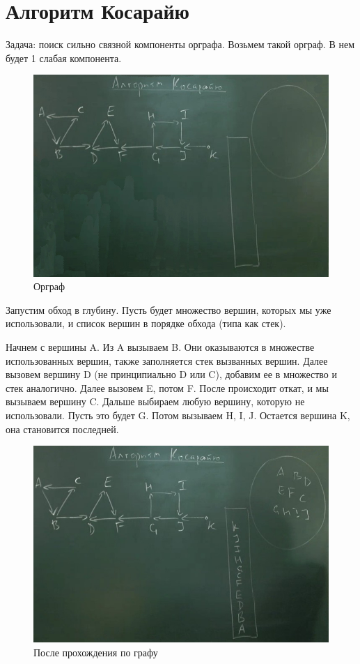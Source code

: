 \section{Алгоритм Косарайю}
Задача: поиск сильно связной компоненты орграфа. Возьмем такой орграф. В нем будет 1 слабая компонента.
\vspace{1.2cm}
\begin{figure}[h!]
	\centering
	\includegraphics[width=0.8\linewidth]{lection_18/kos1}
	\caption{Орграф}
\end{figure}

Запустим обход в глубину. Пусть будет множество вершин, которых мы уже использовали, и список вершин в порядке обхода (типа как стек).

Начнем с вершины A. Из A вызываем B. Они оказываются в множестве использованных вершин, также заполняется стек вызванных вершин. Далее вызовем вершину D (не принципиально D или C), добавим ее в множество и стек аналогично. Далее вызовем E, потом F. После происходит откат, и мы вызываем вершину C. Дальше выбираем любую вершину, которую не использовали. Пусть это будет G. Потом вызываем H, I, J. Остается вершина K, она становится последней.
\vspace{10cm}
\begin{figure}[h!]
	\centering
	\includegraphics[width=0.8\linewidth]{lection_18/kos2}
	\caption{После прохождения по графу}
\end{figure}

